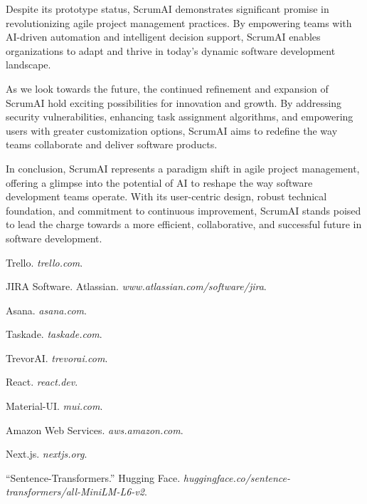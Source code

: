 \documentclass[conference]{IEEEtran}
\begin{document}
Despite its prototype status, ScrumAI demonstrates significant promise in revolutionizing agile project management practices. By empowering teams with AI-driven automation and intelligent decision support, ScrumAI enables organizations to adapt and thrive in today's dynamic software development landscape.

As we look towards the future, the continued refinement and expansion of ScrumAI hold exciting possibilities for innovation and growth. By addressing security vulnerabilities, enhancing task assignment algorithms, and empowering users with greater customization options, ScrumAI aims to redefine the way teams collaborate and deliver software products.

In conclusion, ScrumAI represents a paradigm shift in agile project management, offering a glimpse into the potential of AI to reshape the way software development teams operate. With its user-centric design, robust technical foundation, and commitment to continuous improvement, ScrumAI stands poised to lead the charge towards a more efficient, collaborative, and successful future in software development.


\begin{thebibliography}{00}
Trello. \emph{trello.com}.

JIRA Software. Atlassian. \emph{www.atlassian.com/software/jira}.

Asana. \emph{asana.com}.

Taskade. \emph{taskade.com}.

TrevorAI. \emph{trevorai.com}.

React. \emph{react.dev}.

Material-UI. \emph{mui.com}.

Amazon Web Services. \emph{aws.amazon.com}.

Next.js. \emph{nextjs.org}.

``Sentence-Transformers.'' Hugging Face. \emph{huggingface.co/sentence-transformers/all-MiniLM-L6-v2}.
    
\end{thebibliography}
\vspace{12pt}
\end{document}
